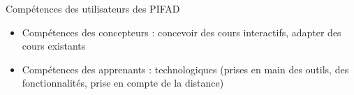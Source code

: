 Compétences des utilisateurs des PIFAD
\begin{itemize}
	\item Compétences des concepteurs : concevoir des cours interactifs, adapter des cours existants
	\item Compétences des apprenants : technologiques (prises en main des outils, des fonctionnalités, prise en compte de la distance)
\end{itemize}


